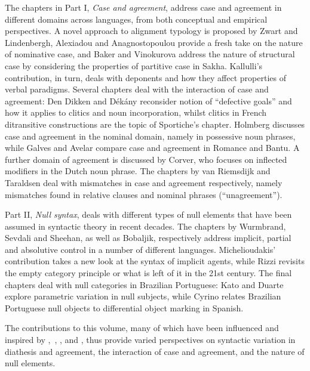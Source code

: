 \documentclass[output=paper]{langsci/langscibook}
\begin{document}
The chapters in Part I, \emph{Case and agreement}, address case and agreement
in different domains across languages, from both conceptual and empirical
perspectives. A novel approach to alignment typology is proposed by Zwart and
Lindenbergh, Alexiadou and Anagnostopoulou provide a fresh take on the nature
of nominative case, and Baker and Vinokurova address the nature of structural
case by considering the properties of partitive case in Sakha. Kallulli’s
contribution, in turn, deals with deponents and how they affect properties of
verbal paradigms. Several chapters deal with the interaction of case and
agreement: Den Dikken and Dékány reconsider  notion of
“defective goals” and how it applies to clitics and noun incorporation, whilst
clitics in French ditransitive constructions are the topic of Sportiche’s
chapter. Holmberg discusses case and agreement in the nominal domain, namely in
possessive noun phrases, while Galves and Avelar compare case and agreement in
Romance and Bantu. A further domain of agreement is discussed by Corver, who
focuses on inflected modifiers in the Dutch noun phrase. The chapters by van
Riemsdijk and Taraldsen deal with mismatches in case and agreement
respectively, namely mismatches found in relative clauses and nominal phrases
(\enquote{unagreement}).

Part II, \emph{Null syntax}, deals with different types of null elements that
have been assumed in syntactic theory in recent decades. The chapters by
Wurmbrand, Sevdali and Sheehan, as well as Bobaljik, respectively address
implicit, partial and absolutive control in a number of different languages.
Michelioudakis’ contribution takes a new look at the syntax of implicit agents,
while Rizzi revisits the empty category principle or what is left of it in the
21st century. The final chapters deal with null categories in Brazilian
Portuguese: Kato and Duarte explore parametric variation in null subjects,
while Cyrino relates Brazilian Portuguese null objects to differential object
marking in Spanish.

The contributions to this volume, many of which have been influenced and
inspired by \textcite{Roberts2010,Roberts2012},~\textcite{RobRou2003},
\textcite{RobHol2010}, and \textcite{BibRob2015}, thus provide varied
perspectives on syntactic variation in diathesis and agreement, the interaction
of case and agreement, and the nature of null elements.

{\sloppy
\printbibliography[heading=subbibliography,notkeyword=this]
}
\end{document}
